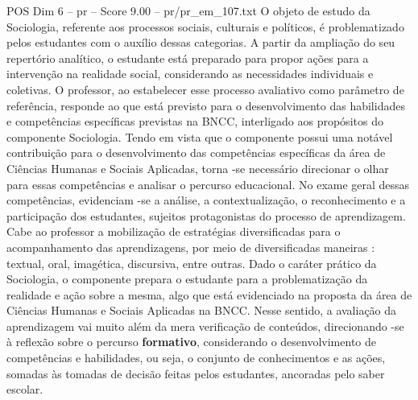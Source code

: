 \begin{textsample}{POS Dim 6 – pr – Score 9.00 – pr/pr\_em\_107.txt}
O objeto de estudo da Sociologia, referente aos processos sociais, culturais e políticos, é problematizado pelos estudantes com o auxílio dessas categorias.
A partir da ampliação do seu repertório analítico, o estudante está preparado para propor ações para a intervenção na realidade social, considerando as necessidades individuais e coletivas.
O professor, ao estabelecer esse processo avaliativo como parâmetro de referência, responde ao que está previsto para o desenvolvimento das habilidades e competências específicas previstas na BNCC, interligado aos propósitos do componente Sociologia.
Tendo em vista que o componente possui uma notável contribuição para o desenvolvimento das competências específicas da área de Ciências Humanas e Sociais Aplicadas, torna -se necessário direcionar o olhar para essas competências e analisar o percurso educacional.
No exame geral dessas competências, evidenciam -se a análise, a contextualização, o reconhecimento e a participação dos estudantes, sujeitos protagonistas do processo de aprendizagem.
Cabe ao professor a mobilização de estratégias diversificadas para o acompanhamento das aprendizagens, por meio de diversificadas maneiras : textual, oral, imagética, discursiva, entre outras.
Dado o caráter prático da Sociologia, o componente prepara o estudante para a problematização da realidade e ação sobre a mesma, algo que está evidenciado na proposta da área de Ciências Humanas e Sociais Aplicadas na BNCC.
Nesse sentido, a avaliação da aprendizagem vai muito além da mera verificação de conteúdos, direcionando -se à reflexão sobre o percurso \textbf{formativo}, considerando o desenvolvimento de competências e habilidades, ou seja, o conjunto de conhecimentos e as ações, somadas às tomadas de decisão feitas pelos estudantes, ancoradas pelo saber escolar.

\end{textsample}
